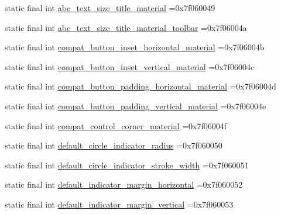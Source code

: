 \begin{DoxyCompactItemize}
\item 
static final int \mbox{\hyperlink{classcom_1_1example_1_1trainawearapplication_1_1_r_1_1dimen_a236569fde054369ddd72097d40e93f16}{abc\+\_\+text\+\_\+size\+\_\+title\+\_\+material}} =0x7f060049
\item 
static final int \mbox{\hyperlink{classcom_1_1example_1_1trainawearapplication_1_1_r_1_1dimen_a5b645b516f74ba0b57f6cdf5a2711632}{abc\+\_\+text\+\_\+size\+\_\+title\+\_\+material\+\_\+toolbar}} =0x7f06004a
\item 
static final int \mbox{\hyperlink{classcom_1_1example_1_1trainawearapplication_1_1_r_1_1dimen_a99a1d512e27bf8a4ee0c3efca0b5b650}{compat\+\_\+button\+\_\+inset\+\_\+horizontal\+\_\+material}} =0x7f06004b
\item 
static final int \mbox{\hyperlink{classcom_1_1example_1_1trainawearapplication_1_1_r_1_1dimen_a53b6a874d7f515a4e3316c87221217df}{compat\+\_\+button\+\_\+inset\+\_\+vertical\+\_\+material}} =0x7f06004c
\item 
static final int \mbox{\hyperlink{classcom_1_1example_1_1trainawearapplication_1_1_r_1_1dimen_a1683771e065b30a732623f3b65e226b1}{compat\+\_\+button\+\_\+padding\+\_\+horizontal\+\_\+material}} =0x7f06004d
\item 
static final int \mbox{\hyperlink{classcom_1_1example_1_1trainawearapplication_1_1_r_1_1dimen_aa59d8117e8b665a2061c550c25b943f8}{compat\+\_\+button\+\_\+padding\+\_\+vertical\+\_\+material}} =0x7f06004e
\item 
static final int \mbox{\hyperlink{classcom_1_1example_1_1trainawearapplication_1_1_r_1_1dimen_a7f01ba1f54d8dbe03315a4fd80a31f89}{compat\+\_\+control\+\_\+corner\+\_\+material}} =0x7f06004f
\item 
static final int \mbox{\hyperlink{classcom_1_1example_1_1trainawearapplication_1_1_r_1_1dimen_a6d268a35c6eacb01fad3911e69f02030}{default\+\_\+circle\+\_\+indicator\+\_\+radius}} =0x7f060050
\item 
static final int \mbox{\hyperlink{classcom_1_1example_1_1trainawearapplication_1_1_r_1_1dimen_af47c261a7e777ee5092fb055a137c05a}{default\+\_\+circle\+\_\+indicator\+\_\+stroke\+\_\+width}} =0x7f060051
\item 
static final int \mbox{\hyperlink{classcom_1_1example_1_1trainawearapplication_1_1_r_1_1dimen_a15fb3773f9a056339306889a0b222218}{default\+\_\+indicator\+\_\+margin\+\_\+horizontal}} =0x7f060052
\item 
static final int \mbox{\hyperlink{classcom_1_1example_1_1trainawearapplication_1_1_r_1_1dimen_af9ac03991edb8a2c49a931d078e782c4}{default\+\_\+indicator\+\_\+margin\+\_\+vertical}} =0x7f060053

\end{DoxyCompactItemize}
